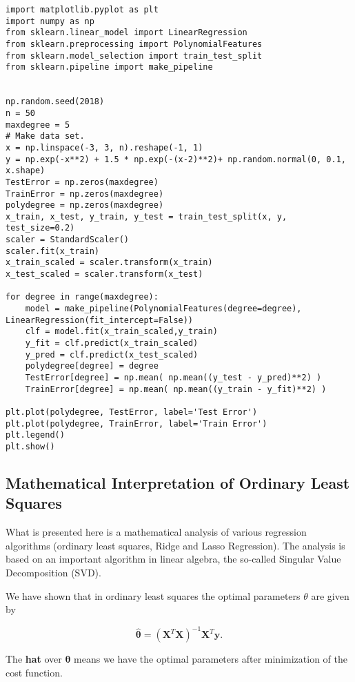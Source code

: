 \documentclass[%
oneside,                 %
final,                   %
10pt]{article}
\begin{document}
\begin{verbatim}
import matplotlib.pyplot as plt
import numpy as np
from sklearn.linear_model import LinearRegression
from sklearn.preprocessing import PolynomialFeatures
from sklearn.model_selection import train_test_split
from sklearn.pipeline import make_pipeline


np.random.seed(2018)
n = 50
maxdegree = 5
# Make data set.
x = np.linspace(-3, 3, n).reshape(-1, 1)
y = np.exp(-x**2) + 1.5 * np.exp(-(x-2)**2)+ np.random.normal(0, 0.1, x.shape)
TestError = np.zeros(maxdegree)
TrainError = np.zeros(maxdegree)
polydegree = np.zeros(maxdegree)
x_train, x_test, y_train, y_test = train_test_split(x, y, test_size=0.2)
scaler = StandardScaler()
scaler.fit(x_train)
x_train_scaled = scaler.transform(x_train)
x_test_scaled = scaler.transform(x_test)

for degree in range(maxdegree):
    model = make_pipeline(PolynomialFeatures(degree=degree), LinearRegression(fit_intercept=False))
    clf = model.fit(x_train_scaled,y_train)
    y_fit = clf.predict(x_train_scaled)
    y_pred = clf.predict(x_test_scaled) 
    polydegree[degree] = degree
    TestError[degree] = np.mean( np.mean((y_test - y_pred)**2) )
    TrainError[degree] = np.mean( np.mean((y_train - y_fit)**2) )

plt.plot(polydegree, TestError, label='Test Error')
plt.plot(polydegree, TrainError, label='Train Error')
plt.legend()
plt.show()

\end{verbatim}


\subsection*{Mathematical Interpretation of Ordinary Least Squares}

What is presented here is a mathematical analysis of various regression algorithms (ordinary least  squares, Ridge and Lasso Regression). The analysis is based on an important algorithm in linear algebra, the so-called Singular Value Decomposition (SVD). 

We have shown that in ordinary least squares the optimal parameters $\theta$ are given by

\[
\hat{\bm{\theta}} = \left(\bm{X}^T\bm{X}\right)^{-1}\bm{X}^T\bm{y}.
\]

The \textbf{hat} over $\bm{\theta}$ means we have the optimal parameters after minimization of the cost function.
\end{document}
